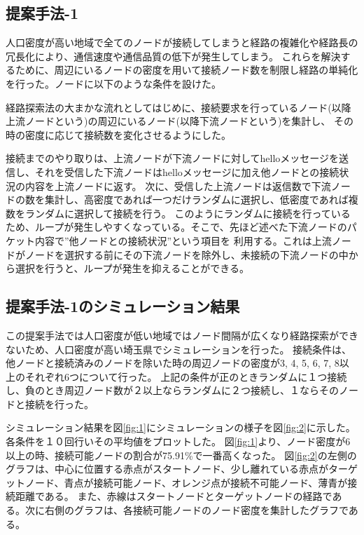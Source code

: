 \documentclass[a4paper, 9pt]{ltjsarticle}
\begin{document}
\subsection{提案手法-1}
人口密度が高い地域で全てのノードが接続してしまうと経路の複雑化や経路長の冗長化により、通信速度や通信品質の低下が発生してしまう。
これらを解決するために、周辺にいるノードの密度を用いて接続ノード数を制限し経路の単純化を行った。ノードに以下のような条件を設けた。\par
経路探索法の大まかな流れとしてはじめに、接続要求を行っているノード(以降上流ノードという)の周辺にいるノード(以降下流ノードという)を集計し、
その時の密度に応じて接続数を変化させるようにした。\par
接続までのやり取りは、上流ノードが下流ノードに対してhelloメッセージを送信し、それを受信した下流ノードはhelloメッセージに加え他ノードとの接続状況の内容を上流ノードに返す。
次に、受信した上流ノードは返信数で下流ノードの数を集計し、高密度であれば一つだけランダムに選択し、低密度であれば複数をランダムに選択して接続を行う。
このようにランダムに接続を行っているため、ループが発生しやすくなっている。そこで、先ほど述べた下流ノードのパケット内容で”他ノードとの接続状況”という項目を
利用する。これは上流ノードがノードを選択する前にその下流ノードを除外し、未接続の下流ノードの中から選択を行うと、ループが発生を抑えることができる。\par

\subsection{提案手法-1のシミュレーション結果}
この提案手法では人口密度が低い地域ではノード間隔が広くなり経路探索ができないため、人口密度が高い埼玉県でシミュレーションを行った。
接続条件は、他ノードと接続済みのノードを除いた時の周辺ノードの密度が3, 4, 5, 6, 7, 8以上のそれぞれ6つについて行った。
上記の条件が正のときランダムに１つ接続し、負のとき周辺ノード数が２以上ならランダムに２つ接続し、１ならそのノードと接続を行った。\par
シミュレーション結果を図\ref{fig:1}にシミュレーションの様子を図\ref{fig:2}に示した。各条件を１０回行いその平均値をプロットした。
図\ref{fig:1}より、ノード密度が6以上の時、接続可能ノードの割合が75.91\%で一番高くなった。
図\ref{fig:2}の左側のグラフは、中心に位置する赤点がスタートノード、少し離れている赤点がターゲットノード、青点が接続可能ノード、オレンジ点が接続不可能ノード、薄青が接続距離である。
また、赤線はスタートノードとターゲットノードの経路である。次に右側のグラフは、各接続可能ノードのノード密度を集計したグラフである。\par
\end{document}

